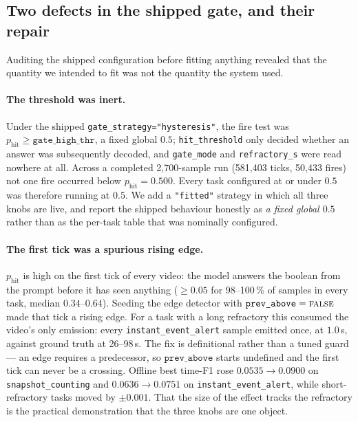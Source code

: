 \subsection{Two defects in the shipped gate, and their repair}

Auditing the shipped configuration before fitting anything revealed that the
quantity we intended to fit was not the quantity the system used.

\paragraph{The threshold was inert.} Under the shipped
\texttt{gate\_strategy="hysteresis"}, the fire test was
$p_{\mathrm{hit}} \ge \texttt{gate\_high\_thr}$, a fixed global $0.5$;
\texttt{hit\_threshold} only decided whether an answer was subsequently decoded,
and \texttt{gate\_mode} and \texttt{refractory\_s} were read nowhere at all.
Across a completed 2{,}700-sample run (581{,}403 ticks, 50{,}433 fires) not one
fire occurred below $p_{\mathrm{hit}}=0.500$. Every task configured at or under
$0.5$ was therefore running at $0.5$. We add a \texttt{"fitted"} strategy in which
all three knobs are live, and report the shipped behaviour honestly as
\emph{a fixed global $0.5$} rather than as the per-task table that was nominally
configured.

\paragraph{The first tick was a spurious rising edge.} $p_{\mathrm{hit}}$ is high
on the first tick of every video: the model answers the boolean from the prompt
before it has seen anything ($\ge 0.05$ for 98--100\,\% of samples in every task,
median $0.34$--$0.64$). Seeding the edge detector with
$\texttt{prev\_above}=\textsc{false}$ made that tick a rising edge. For a task with
a long refractory this consumed the video's only emission: every
\texttt{instant\_event\_alert} sample emitted once, at $1.0$\,s, against ground
truth at 26--98\,s. The fix is definitional rather than a tuned guard --- an edge
requires a predecessor, so $\texttt{prev\_above}$ starts undefined and the first
tick can never be a crossing. Offline best time-F1 rose $0.0535 \to 0.0900$ on
\texttt{snapshot\_counting} and $0.0636 \to 0.0751$ on
\texttt{instant\_event\_alert}, while short-refractory tasks moved by $\pm 0.001$.
That the size of the effect tracks the refractory is the practical demonstration
that the three knobs are one object.
